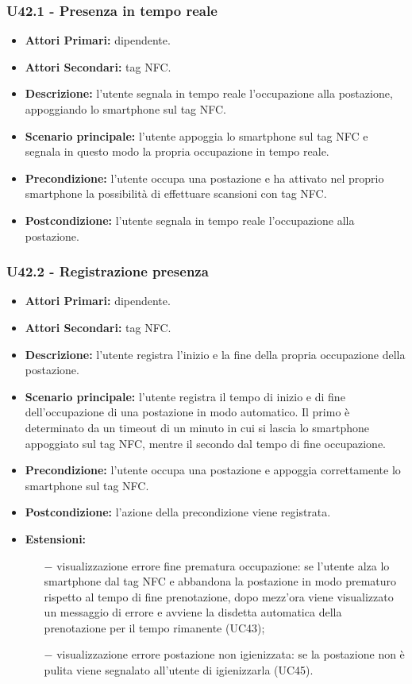 \subsubsection{ U42.1 - Presenza in tempo reale}
\begin{itemize}
	\item\textbf{Attori Primari:} dipendente.
	\item\textbf{Attori Secondari:} tag NFC.
	\item\textbf{Descrizione:} l’utente segnala in tempo reale l'occupazione alla postazione, appoggiando lo smartphone sul tag NFC.
	\item\textbf{Scenario principale:} l’utente appoggia lo smartphone sul tag NFC e segnala in questo modo la propria occupazione in tempo reale.
	\item\textbf{Precondizione:} l’utente occupa una postazione e ha attivato nel proprio smartphone la possibilità di effettuare scansioni con tag NFC.
	\item\textbf{Postcondizione:} l’utente segnala in tempo reale l'occupazione alla postazione.
\end{itemize}

\subsubsection{ U42.2 - Registrazione presenza}
\begin{itemize}
	\item\textbf{Attori Primari:} dipendente.
	\item\textbf{Attori Secondari:} tag NFC.
	\item\textbf{Descrizione:} l’utente registra l'inizio e la fine della propria occupazione della postazione.
	\item\textbf{Scenario principale:} l'utente registra il tempo di inizio e di fine dell'occupazione di una postazione in modo automatico. Il primo è determinato da un timeout di un minuto in cui si lascia lo smartphone appoggiato sul tag NFC, mentre il secondo dal tempo di fine occupazione.
	\item\textbf{Precondizione:} l’utente occupa una postazione e appoggia correttamente lo smartphone sul tag NFC. 
	\item\textbf{Postcondizione:} l'azione della precondizione viene registrata.
	\item\textbf{Estensioni:} 
	\begin{itemize}
		\item[$-$] visualizzazione errore fine prematura occupazione: se l'utente alza lo smartphone dal tag NFC e abbandona la postazione in modo prematuro rispetto al tempo di fine prenotazione, dopo mezz'ora viene visualizzato un messaggio di errore e avviene la disdetta automatica della prenotazione per il tempo rimanente (UC43);
	\end{itemize}
	\begin{itemize}
	\item[$-$] visualizzazione errore postazione non igienizzata: se la postazione non è pulita viene segnalato all'utente di igienizzarla (UC45).
	\end{itemize}
\end{itemize}

